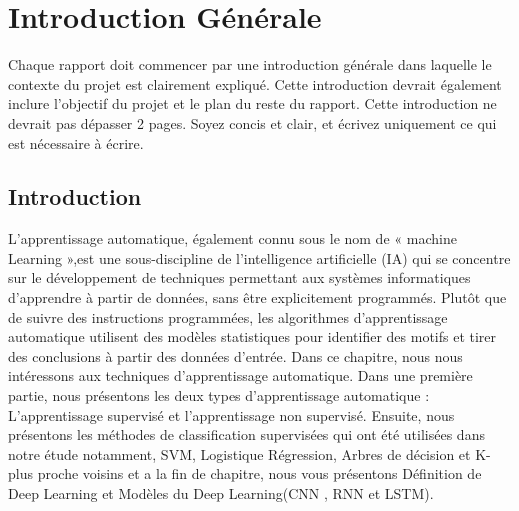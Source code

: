 \chapter{Introduction Générale}
Chaque rapport doit commencer par une introduction générale dans laquelle le contexte du projet est clairement expliqué. Cette introduction devrait également inclure l'objectif du projet et le plan du reste du rapport. Cette introduction ne devrait pas dépasser 2 pages. Soyez concis et clair, et écrivez uniquement ce qui est nécessaire à écrire.

\section{Introduction}
L'apprentissage automatique, également connu sous le nom de « machine Learning »,est une sous-discipline de l'intelligence artificielle (IA) qui se concentre sur le développement de techniques permettant aux systèmes informatiques d'apprendre à partir de données, sans être explicitement programmés. Plutôt que de suivre des instructions programmées, les algorithmes d'apprentissage automatique utilisent des modèles statistiques pour identifier des motifs et tirer des conclusions à partir des données d’entrée. \cite{1}
Dans ce chapitre, nous nous intéressons aux techniques d’apprentissage automatique. Dans une première partie, nous présentons les deux types d’apprentissage automatique :
L’apprentissage supervisé et l’apprentissage non supervisé. Ensuite, nous présentons les méthodes de classification supervisées qui ont été utilisées dans notre étude notamment, SVM, Logistique Régression, Arbres de décision et K-plus proche voisins et a la fin de chapitre, nous vous présentons Définition de Deep Learning et Modèles du Deep Learning(CNN , RNN et LSTM).

